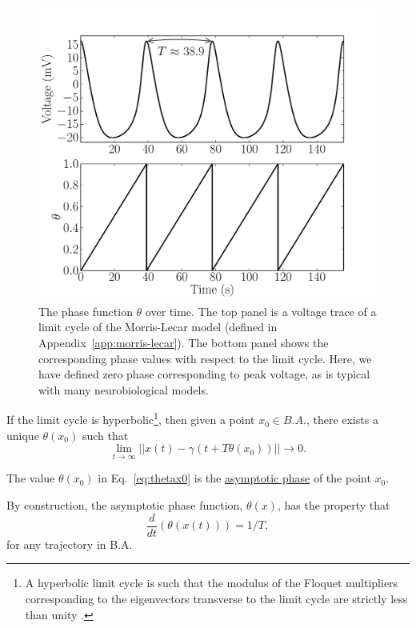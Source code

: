 \documentclass[12pt]{article}
\begin{document}
  \begin{figure}[h!]
   \includegraphics[width=\textwidth]{dthetadt_fig.pdf}
   \caption[The phase function $\theta$ over time]{The phase function $\theta$ over time.  The top panel is a voltage trace of a limit cycle of the Morris-Lecar model (defined in Appendix~\ref{app:morris-lecar}).  The bottom panel shows the corresponding phase values with respect to the limit cycle.  Here, we have defined zero phase corresponding to peak voltage, as is typical with many neurobiological models.}
  \label{fig:dthetadt}\end{figure}
  If the limit cycle is hyperbolic\footnote{A hyperbolic limit cycle is such that the modulus of the Floquet multipliers corresponding to the eigenvectors transverse to the limit cycle are strictly less than unity \cite{Guckenheimer1975JMathBiol}.}, then given a point $x_0 \in B.A.$, there exists a unique $\theta(x_0)$  such that 
  \begin{equation}\label{eq:thetax0}
    \lim_{t \rightarrow \infty} || x(t) - \gamma(t + T\theta(x_0)) || \rightarrow 0.
  \end{equation}
  \begin{definition}
  The value $\theta(x_0)$ in Eq.~\eqref{eq:thetax0} is the \underline{asymptotic phase} of the point $x_0$.
  \end{definition}
  By construction, the asymptotic phase function, $\theta(x)$, has the property that
  \begin{equation}
   \frac{d }{dt}\left (\theta(x(t)) \right ) = 1/T,
  \end{equation}
  for any trajectory in B.A.
  
\end{document}
